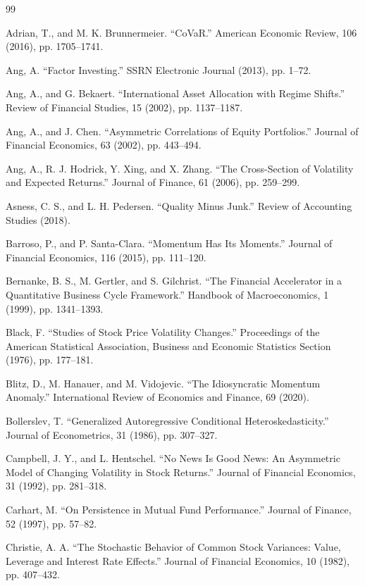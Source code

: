 \documentclass{article}
\begin{document}
\begin{thebibliography}{99}

 Adrian, T., and M. K. Brunnermeier. “CoVaR.” American Economic Review, 106 (2016), pp. 1705–1741.

 Ang, A. “Factor Investing.” SSRN Electronic Journal (2013), pp. 1–72.

 Ang, A., and G. Bekaert. “International Asset Allocation with Regime Shifts.” Review of Financial Studies, 15 (2002), pp. 1137–1187.

 Ang, A., and J. Chen. “Asymmetric Correlations of Equity Portfolios.” Journal of Financial Economics, 63 (2002), pp. 443–494.

 Ang, A., R. J. Hodrick, Y. Xing, and X. Zhang. “The Cross-Section of Volatility and Expected Returns.” Journal of Finance, 61 (2006), pp. 259–299.

 Asness, C. S., and L. H. Pedersen. “Quality Minus Junk.” Review of Accounting Studies (2018).

 Barroso, P., and P. Santa-Clara. “Momentum Has Its Moments.” Journal of Financial Economics, 116 (2015), pp. 111–120.

 Bernanke, B. S., M. Gertler, and S. Gilchrist. “The Financial Accelerator in a Quantitative Business Cycle Framework.” Handbook of Macroeconomics, 1 (1999), pp. 1341–1393.

 Black, F. “Studies of Stock Price Volatility Changes.” Proceedings of the American Statistical Association, Business and Economic Statistics Section (1976), pp. 177–181.

 Blitz, D., M. Hanauer, and M. Vidojevic. “The Idiosyncratic Momentum Anomaly.” International Review of Economics and Finance, 69 (2020).

 Bollerslev, T. “Generalized Autoregressive Conditional Heteroskedasticity.” Journal of Econometrics, 31 (1986), pp. 307–327.

 Campbell, J. Y., and L. Hentschel. “No News Is Good News: An Asymmetric Model of Changing Volatility in Stock Returns.” Journal of Financial Economics, 31 (1992), pp. 281–318.

 Carhart, M. “On Persistence in Mutual Fund Performance.” Journal of Finance, 52 (1997), pp. 57–82.

 Christie, A. A. “The Stochastic Behavior of Common Stock Variances: Value, Leverage and Interest Rate Effects.” Journal of Financial Economics, 10 (1982), pp. 407–432.


\end{thebibliography}
\end{document}

